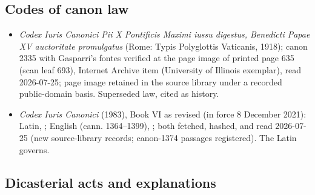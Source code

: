 \subsection*{Codes of canon law}

{\fontsize{8.6}{9.6}\selectfont
\begin{itemize}[itemsep=0pt,parsep=0pt,topsep=0.05em]
\item \emph{Codex Iuris Canonici Pii X Pontificis Maximi iussu digestus, Benedicti Papae XV auctoritate promulgatus} (Rome: Typis Polyglottis Vaticanis, 1918); canon 2335 with Gasparri's fontes verified at the page image of printed page 635 (scan leaf 693), Internet Archive item  (University of Illinois exemplar), read 2026-07-25; page image retained in the source library under a recorded public-domain basis. Superseded law, cited as history.
\item \emph{Codex Iuris Canonici} (1983), Book VI as revised (in force 8 December 2021): Latin, ; English (cann. 1364--1399), ; both fetched, hashed, and read 2026-07-25 (new source-library records; canon-1374 passages registered). The Latin governs.
\end{itemize}}

\subsection*{Dicasterial acts and explanations}


